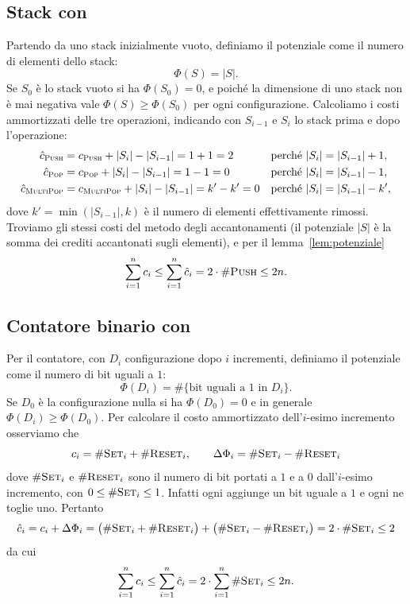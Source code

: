 \subsection{Stack con \MultiPop}
Partendo da uno stack inizialmente vuoto, definiamo il potenziale come il numero di elementi dello stack:
\[
\Phi(S) = |S|.
\]
Se $S_0$ è lo stack vuoto si ha $\Phi(S_0) = 0$, e poiché la dimensione di uno stack non è mai negativa vale $\Phi(S) \ge \Phi(S_0)$ per ogni configurazione. Calcoliamo i costi ammortizzati delle tre operazioni, indicando con $S_{i-1}$ e $S_i$ lo stack prima e dopo l'operazione:
\begin{align*}
\hat{c}_{\textsc{Push}} &= c_{\textsc{Push}} + |S_i| - |S_{i-1}| = 1 + 1 = 2 && \text{perché } |S_i| = |S_{i-1}|+1, \\
\hat{c}_{\textsc{Pop}} &= c_{\textsc{Pop}} + |S_i| - |S_{i-1}| = 1 - 1 = 0 && \text{perché } |S_i| = |S_{i-1}|-1, \\
\hat{c}_{\textsc{MultiPop}} &= c_{\textsc{MultiPop}} + |S_i| - |S_{i-1}| = k' - k' = 0 && \text{perché } |S_i| = |S_{i-1}|-k',
\end{align*}
dove $k' = \min(|S_{i-1}|,k)$ è il numero di elementi effettivamente rimossi. Troviamo gli stessi costi del metodo degli accantonamenti (il potenziale $|S|$ è la somma dei crediti accantonati sugli elementi), e per il lemma~\ref{lem:potenziale}
\[
\sum_{i=1}^{n} c_i \le \sum_{i=1}^{n} \hat{c}_i = 2\cdot\#\textsc{Push} \le 2n.
\]

\subsection{Contatore binario con \Increment}
Per il contatore, con $D_i$ configurazione dopo $i$ incrementi, definiamo il potenziale come il numero di bit uguali a $1$:
\[
\Phi(D_i) = \#\{\text{bit uguali a } 1 \text{ in } D_i\}.
\]
Se $D_0$ è la configurazione nulla si ha $\Phi(D_0) = 0$ e in generale $\Phi(D_i) \ge \Phi(D_0)$. Per calcolare il costo ammortizzato dell'$i$-esimo incremento osserviamo che
\[
c_i = \#\textsc{Set}_i + \#\textsc{Reset}_i, \qquad \Delta\Phi_i = \#\textsc{Set}_i - \#\textsc{Reset}_i
\]
dove $\#\textsc{Set}_i$ e $\#\textsc{Reset}_i$ sono il numero di bit portati a $1$ e a $0$ dall'$i$-esimo incremento, con $0 \le \#\textsc{Set}_i \le 1$. Infatti ogni \SetBit{} aggiunge un bit uguale a $1$ e ogni \ResetBit{} ne toglie uno. Pertanto
\[
\hat{c}_i = c_i + \Delta\Phi_i = \big(\#\textsc{Set}_i + \#\textsc{Reset}_i\big) + \big(\#\textsc{Set}_i - \#\textsc{Reset}_i\big) = 2\cdot\#\textsc{Set}_i \le 2
\]
da cui
\[
\sum_{i=1}^{n} c_i \le \sum_{i=1}^{n} \hat{c}_i = 2\cdot \sum_{i=1}^{n} \#\textsc{Set}_i \le 2n.
\]

